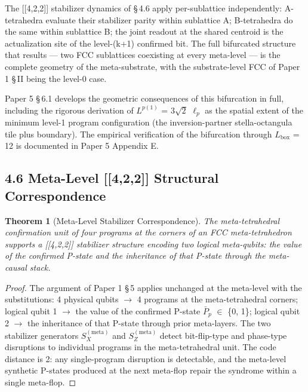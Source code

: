 \documentclass[11pt,oneside]{report}
\newtheorem{theorem}{Theorem}[section]
\theoremstyle{definition}
\theoremstyle{remark}
\begin{document}
The [[4,2,2]] stabilizer dynamics of \S\,4.6 apply per-sublattice
independently: A-tetrahedra evaluate their stabilizer parity within
sublattice A; B-tetrahedra do the same within sublattice B; the joint
readout at the shared centroid is the actualization site of the
level-(k+1) confirmed bit. The full bifurcated structure that results
--- two FCC sublattices coexisting at every meta-level --- is the
complete geometry of the meta-substrate, with the substrate-level FCC of
Paper 1 \S\,II being the level-0 case.

Paper 5 \S\,6.1 develops the geometric consequences of this bifurcation in
full, including the rigorous derivation of \ensuremath{L^{p(1)}} = \ensuremath{3\sqrt{2}} \ensuremath{\ell_{p}} as the
spatial extent of the minimum level-1 program configuration (the
inversion-partner stella-octangula tile plus boundary). The empirical
verification of the bifurcation through \ensuremath{L_{\mathrm{box}}} = 12 is documented in
Paper 5 Appendix E.

\subsection*{4.6 Meta-Level [[4,2,2]] Structural Correspondence}

\begin{theorem}[Meta-Level Stabilizer Correspondence]
The meta-tetrahedral
confirmation unit of four programs at the corners of an FCC
meta-tetrahedron supports a [[4,2,2]] stabilizer structure
encoding two logical meta-qubits: the value of the confirmed P-state and
the inheritance of that P-state through the meta-causal stack.
\end{theorem}

\begin{proof}
The argument of Paper 1 \S\,5 applies unchanged at the meta-level
with the substitutions: 4 physical qubits \ensuremath{\to} 4 programs at the
meta-tetrahedral corners; logical qubit 1 \ensuremath{\to} the value of the confirmed
P-state \ensuremath{\bar{P}_{p}} \ensuremath{\in} \{0, 1\}; logical qubit 2 \ensuremath{\to} the inheritance of that
P-state through prior meta-layers. The two stabilizer generators
\ensuremath{S_{X}^{(\text{meta})}} and \ensuremath{S_{Z}^{(\text{meta})}} detect bit-flip-type and phase-type
disruptions to individual programs in the meta-tetrahedral unit. The
code distance is 2: any single-program disruption is detectable, and the
meta-level synthetic P-states produced at the next meta-flop repair the
syndrome within a single meta-flop.

\end{proof}
\end{document}
